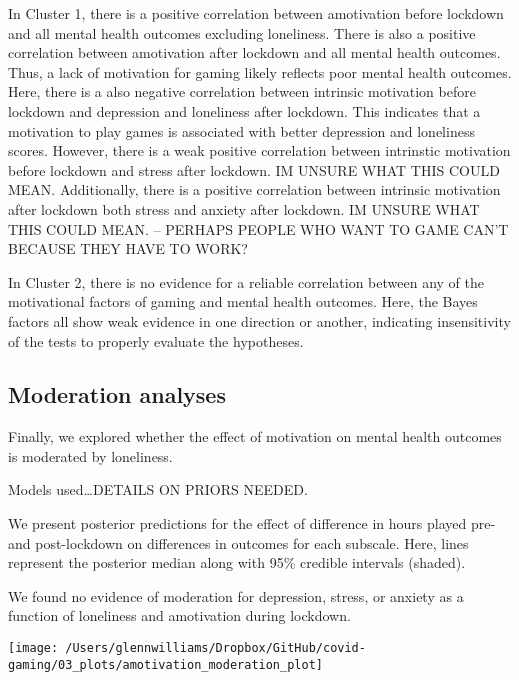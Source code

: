 \documentclass[
  english,
  jou,floatsintext]{apa6}
\begin{document}
In Cluster 1, there is a positive correlation between amotivation before lockdown and all mental health outcomes excluding loneliness. There is also a positive correlation between amotivation after lockdown and all mental health outcomes. Thus, a lack of motivation for gaming likely reflects poor mental health outcomes. Here, there is a also negative correlation between intrinsic motivation before lockdown and depression and loneliness after lockdown. This indicates that a motivation to play games is associated with better depression and loneliness scores. However, there is a weak positive correlation between intrinstic motivation before lockdown and stress after lockdown. IM UNSURE WHAT THIS COULD MEAN. Additionally, there is a positive correlation between intrinsic motivation after lockdown both stress and anxiety after lockdown. IM UNSURE WHAT THIS COULD MEAN. -- PERHAPS PEOPLE WHO WANT TO GAME CAN'T BECAUSE THEY HAVE TO WORK?

In Cluster 2, there is no evidence for a reliable correlation between any of the motivational factors of gaming and mental health outcomes. Here, the Bayes factors all show weak evidence in one direction or another, indicating insensitivity of the tests to properly evaluate the hypotheses.

\hypertarget{moderation-analyses}{%
\subsection{Moderation analyses}\label{moderation-analyses}}

Finally, we explored whether the effect of motivation on mental health outcomes is moderated by loneliness.

Models used\ldots DETAILS ON PRIORS NEEDED.

We present posterior predictions for the effect of difference in hours played pre- and post-lockdown on differences in outcomes for each subscale. Here, lines represent the posterior median along with 95\% credible intervals (shaded).

We found no evidence of moderation for depression, stress, or anxiety as a function of loneliness and amotivation during lockdown.

\begin{figure*}[!htbp]

{\centering \texttt{[image: /Users/glennwilliams/Dropbox/GitHub/covid-gaming/03\_plots/amotivation\_moderation\_plot]} 

}

\caption{ }\label{fig:amotivation-moderation-plot}
\end{figure*}
\end{document}
